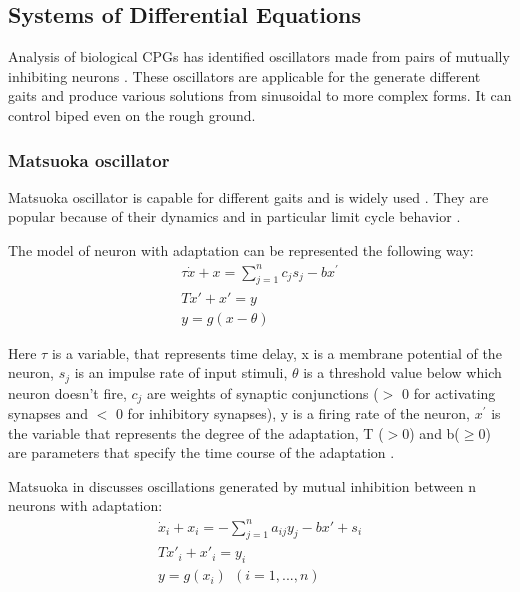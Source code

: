 \documentclass[12pt,a4paper]{report}
\begin{document}
		\subsection{Systems of Differential Equations}
			Analysis of biological CPGs has identified oscillators made from pairs of mutually inhibiting neurons \cite{grillner1995neural}. These oscillators are applicable for the  generate different gaits and produce various solutions from sinusoidal to more complex forms. It can control biped even on the rough ground.
			\subsubsection{Matsuoka oscillator}
				Matsuoka oscillator is capable for different gaits and is widely used \cite{wright2014intelligent}. They are popular because of their dynamics and in particular limit cycle behavior \cite{matsuoka1985sustained}.
				
				The model of neuron with adaptation can be represented the following way:
				\begin{equation}\label{eq:Mats1}
					\begin{split}
						\tau \dot{x} + x = \sum^n_{j = 1} c_j s_j - b x^{\prime}\\
						T \dot{x} \prime  + x \prime = y\\
						y = g(x - \theta)
					\end{split}
				\end{equation}
				
				Here $\tau$ is a variable, that represents time delay, x is a membrane potential of the neuron, $s_j$ is an impulse rate of input stimuli, $\theta$ is a threshold value below which neuron doesn't fire, $c_j$ are weights of synaptic conjunctions ($>$ 0 for activating synapses and $<$ 0 for inhibitory synapses), y is a firing rate of the neuron, $x^{\prime}$ is the variable that represents the degree of the adaptation, T ($>$0) and b($\geq 0$) are parameters that specify the time course of the adaptation \cite{matsuoka1985sustained}.
				
				Matsuoka in \cite{matsuoka1985sustained} discusses oscillations generated by mutual inhibition between n neurons with adaptation:
				\begin{equation}\label{eq:Mats2}
					\begin{split}
						\dot{x}_i + x_i = - \sum^n_{j = 1} a_{ij} y_j - b x \prime + s_i\\
						T \dot{x} \prime _i  + x \prime _i= y_i\\
						y = g(x_i)\ \ (i = 1,...,n) 
					\end{split}
				\end{equation}
				
\end{document}

